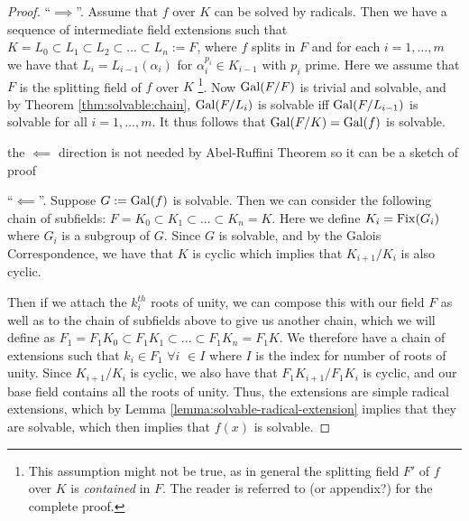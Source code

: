 \begin{proof}
	``$\implies $''. Assume that $f$ over $K$ can be solved by radicals. Then we have a sequence of intermediate field extensions such that $K = L_0 \subset L_1 \subset L_2 \subset ... \subset L_n :=F$, where $f$ splits in $F$ and for each $i = 1, \dots, m$ we have that  $L_i = L_{i-1} (\alpha_i)$ for $\alpha_i ^ {p_i} \in K_{i-1}$ with $p_i$ prime. Here we assume that $F$ is the splitting field of $f$ over $K$ \footnote{This assumption might not be true, as in general the splitting field $F'$ of $f$ over $K$ is \textit{contained} in $F$. The reader is referred to \cite{Stewart} (\TODO or appendix?) for the complete proof. }. Now $\operatorname{Gal}(F / F)$ is trivial and solvable, and by Theorem \ref{thm:solvable:chain}, $\operatorname{Gal}(F / L_i)$ is solvable iff $\operatorname{Gal}(F / L_{i-1})$ is solvable for all $i = 1, \dots, m$. It thus follows that $\operatorname{Gal}(F/ K) = \operatorname{Gal}(f)$ is solvable. 
	
	
	\TODO the $\impliedby$ direction is not needed by Abel-Ruffini Theorem so it can be a sketch of proof
	
	``$\impliedby$''. Suppose $G :=  \operatorname{Gal}(f)$ is solvable. Then we can consider the following chain of subfields: $F=K_0\subset K_1 \subset ... \subset K_n = K$. Here we define $K_i = \operatorname{Fix}(G_i)$ where $G_i$ is a subgroup of $G$.
	Since $G$ is solvable, and by the Galois Correspondence, we have that $K$ is cyclic which implies that $K_{i+1}/K_i$ is also cyclic.
	
	Then if we attach the $k_i^{th}$ roots of unity, we can compose this with our field $F$ as well as to the chain of subfields above to give us another chain, which we will define as $F_1 = F_1K_0 \subset F_1K_1 \subset ... \subset F_1K_n = F_1K$. We therefore have a chain of extensions such that $k_i \in F_1$ $\forall i$ \hspace{0.1cm} $\in I $ where $I$ is the index for number of roots of unity. Since $K_{i+1}/K_i$ is cyclic, we also have that $F_1K_{i+1}/F_1K_i$ is cyclic, and our base field contains all the roots of unity. Thus, the extensions are simple radical extensions, which by Lemma \ref{lemma:solvable-radical-extension} implies that they are solvable, which then implies that $f(x)$ is solvable.
\end{proof}

